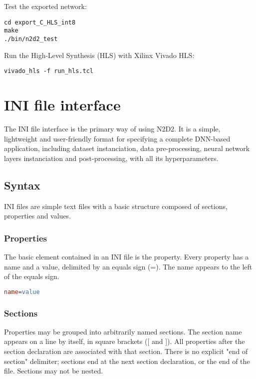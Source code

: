 \documentclass[a4paper,11pt,oneside]{article}
\begin{document}
Test the exported network:
\begin{lstlisting}
cd export_C_HLS_int8
make
./bin/n2d2_test
\end{lstlisting}

Run the High-Level Synthesis (HLS) with Xilinx\textregistered{}
Vivado\textregistered{} HLS:
\begin{lstlisting}
vivado_hls -f run_hls.tcl
\end{lstlisting}

\clearpage

\section{INI file interface}

The INI file interface is the primary way of using N2D2. It is a simple,
lightweight and user-friendly format for specifying a complete DNN-based
application, including dataset instanciation, data pre-processing, neural
network layers instanciation and post-processing, with all its hyperparameters.

\subsection{Syntax}

INI files are simple text files with a basic structure composed of sections,
properties and values.

\subsubsection{Properties}

The basic element contained in an INI file is the property. Every property has
a name and a value, delimited by an equals sign (=). The name appears to the
left of the equals sign.

\begin{lstlisting}[language=ini]
name=value
\end{lstlisting}

\subsubsection{Sections}

Properties may be grouped into arbitrarily named sections. The section name
appears on a line by itself, in square brackets ([ and ]). All properties after
the section declaration are associated with that section. There is no explicit
"end of section" delimiter; sections end at the next section declaration, or the
end of the file. Sections may not be nested.
\end{document}
